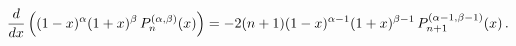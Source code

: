 \[\frac{d}{dx}\left((1-x)^{\alpha}(1+x)^{\beta}\mathop{P^{(\alpha,\beta)}_{n}\/}%
\nolimits\!\left(x\right)\right)=-2(n+1)(1-x)^{\alpha-1}(1+x)^{\beta-1}\mathop%
{P^{(\alpha-1,\beta-1)}_{n+1}\/}\nolimits\!\left(x\right).\]